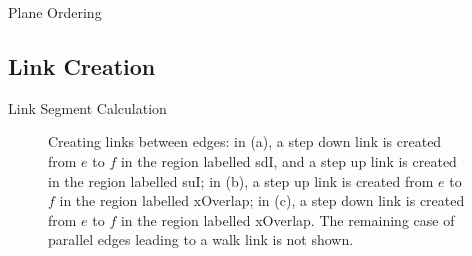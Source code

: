 \documentclass[10pt,twocolumn]{article}
\newenvironment{stusubfig}[1]
{
	\begin{figure}[#1]
	\begin{center}
}
{
	\end{center}
	\end{figure}
}
\begin{document}
\begin{stulisting}[t]
\caption{Plane Ordering}
\label{code:plane-ordering}

\end{stulisting}

\subsection{Link Creation}

\begin{stulisting}[!t]
\caption{Link Segment Calculation}
\label{code:linksegment-calculation}

\end{stulisting}

\begin{stusubfig}{!t}
	\hspace{4mm}%
	\hspace{4mm}%
\caption{Creating links between edges: in (a), a step down link is created from $e$ to $f$ in the region labelled sdI, and a step up link is created in the region labelled suI; in (b), a step up link is created from $e$ to $f$ in the region labelled xOverlap; in (c), a step down link is created from $e$ to $f$ in the region labelled xOverlap. The remaining case of parallel edges leading to a walk link is not shown.}
\label{fig:linkcreation}
\end{stusubfig}
\end{document}
